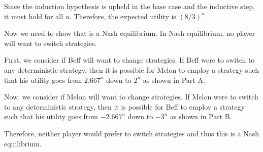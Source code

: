 \documentclass[12pt,twoside]{article}
\begin{document}
\begin{problems}
\begin{problemparts}
Since the induction hypothesis is upheld in the base case and the inductive
step, it must hold for all $n$. Therefore, the expected utility is $\left(8 /
3\right)^n$.

Now we need to show that is a Nash equilibrium. In Nash equilibrium, no
player will want to switch strategies.

First, we consider if Beff will want to change strategies. If Beff were to
switch to any deterministic strategy, then it is possible for Melon to employ
a strategy such that his utility goes from $2.667^n$ down to $2^n$ as shown
in Part A.

Now, we consider if Melon will want to change strategies. If Melon were to
switch to any deterministic strategy, then it is possible for Beff to employ
a strategy such that his utility goes from $-2.667^n$ down to $-3^n$ as shown
in Part B.

Therefore, neither player would prefer to switch strategies and thus this is
a Nash equilibrium.

\end{problemparts}

\end{problems}
\end{document}

